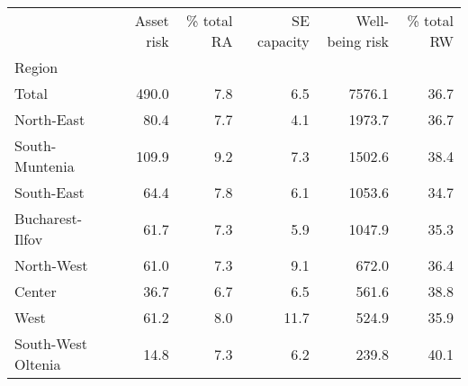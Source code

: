 \begin{tabular}{lrrrrr}
\toprule
{} &  Asset risk &  \% total RA &  SE capacity &  Well-being risk &  \% total RW \\
Region             &             &             &              &                  &             \\
\midrule
Total              &       490.0 &         7.8 &          6.5 &           7576.1 &        36.7 \\
North-East         &        80.4 &         7.7 &          4.1 &           1973.7 &        36.7 \\
South-Muntenia     &       109.9 &         9.2 &          7.3 &           1502.6 &        38.4 \\
South-East         &        64.4 &         7.8 &          6.1 &           1053.6 &        34.7 \\
Bucharest-Ilfov    &        61.7 &         7.3 &          5.9 &           1047.9 &        35.3 \\
North-West         &        61.0 &         7.3 &          9.1 &            672.0 &        36.4 \\
Center             &        36.7 &         6.7 &          6.5 &            561.6 &        38.8 \\
West               &        61.2 &         8.0 &         11.7 &            524.9 &        35.9 \\
South-West Oltenia &        14.8 &         7.3 &          6.2 &            239.8 &        40.1 \\
\bottomrule
\end{tabular}
